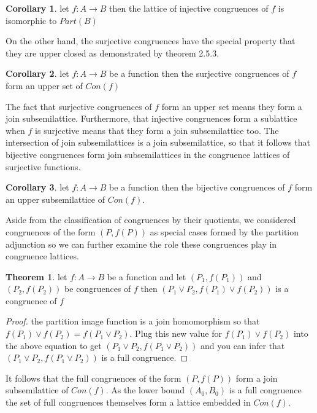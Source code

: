\documentclass[a4paper,11pt, notitlepage]{report}
\theoremstyle{definition}
\newtheorem{theorem}{Theorem}[section]
\newtheorem{corollary}{Corollary}[section]
\begin{document}
\begin{corollary}
let $f: A \to B$ then the lattice of injective congruences of $f$ is isomorphic to $Part(B)$
\end{corollary}

On the other hand, the surjective congruences have the special property that they are upper closed as demonstrated by theorem 2.5.3.

\begin{corollary}
let $f: A \to B$ be a function then the surjective congruences of $f$ form an upper set of $Con(f)$
\end{corollary}

The fact that surjective congruences of $f$ form an upper set means they form a join subsemilattice. Furthermore, that injective congruences form a sublattice when $f$ is surjective means that they form a join subsemilattice too. The intersection of join subsemilattices is a join subsemilattice, so that it follows that bijective congruences form join subsemilattices in the congruence lattices of surjective functions.

\begin{corollary}
let $f: A \to B$ be a function then the bijective congruences of $f$ form an upper subsemilattice of $Con(f)$.
\end{corollary}

Aside from the classification of congruences by their quotients, we considered congruences of the form $(P,f(P))$ as special cases formed by the partition adjunction so we can further examine the role these congruences play in congruence lattices.

\begin{theorem}
let $f: A \to B$ be a function and let $(P_1,f(P_1))$ and $(P_2,f(P_2))$ be congruences of $f$ then $(P_1 \vee P_2, f(P_1) \vee f(P_2))$ is a congruence of $f$
\end{theorem}

\begin{proof}
the partition image function is a join homomorphism so that $f(P_1) \vee f(P_2) = f(P_1 \vee P_2)$. Plug this new value for $f(P_1) \vee f(P_2)$ into the above equation to get $(P_1 \vee P_2, f(P_1 \vee P_2))$ and you can infer that $(P_1 \vee P_2, f(P_1 \vee P_2))$ is a full congruence.
\end{proof}

It follows that the full congruences of the form $(P,f(P))$ form a join subsemilattice of $Con(f)$. As the lower bound $(A_0,B_0)$ is a full congruence the set of full congruences themselves form a lattice embedded in $Con(f)$.
\end{document}
